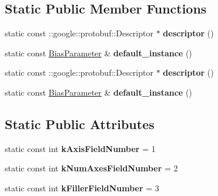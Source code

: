 \subsection*{Static Public Member Functions}
\begin{DoxyCompactItemize}
\item 
\mbox{\label{classcaffe_1_1_bias_parameter_a8006ce9ef7d7e62d9a123a2f7ef22480}} 
static const \+::google\+::protobuf\+::\+Descriptor $\ast$ {\bfseries descriptor} ()
\item 
\mbox{\label{classcaffe_1_1_bias_parameter_a43a4c914d7f22b7e95715e31ed50932f}} 
static const \mbox{\hyperlink{classcaffe_1_1_bias_parameter}{Bias\+Parameter}} \& {\bfseries default\+\_\+instance} ()
\item 
\mbox{\label{classcaffe_1_1_bias_parameter_a68ab78dc3ecc8ddba2ffa7d6bcdced05}} 
static const \+::google\+::protobuf\+::\+Descriptor $\ast$ {\bfseries descriptor} ()
\item 
\mbox{\label{classcaffe_1_1_bias_parameter_a20ea4f8eb8642b289f64925a50543ecc}} 
static const \mbox{\hyperlink{classcaffe_1_1_bias_parameter}{Bias\+Parameter}} \& {\bfseries default\+\_\+instance} ()
\end{DoxyCompactItemize}
\subsection*{Static Public Attributes}
\begin{DoxyCompactItemize}
\item 
\mbox{\label{classcaffe_1_1_bias_parameter_a8727d1673d8e736694964c0dacba9fd2}} 
static const int {\bfseries k\+Axis\+Field\+Number} = 1
\item 
\mbox{\label{classcaffe_1_1_bias_parameter_a9a7d1e6725c0076cd0d1a657f4fb3cbe}} 
static const int {\bfseries k\+Num\+Axes\+Field\+Number} = 2
\item 
\mbox{\label{classcaffe_1_1_bias_parameter_ab33e555201488827d75ddb90c5542984}} 
static const int {\bfseries k\+Filler\+Field\+Number} = 3
\end{DoxyCompactItemize}
